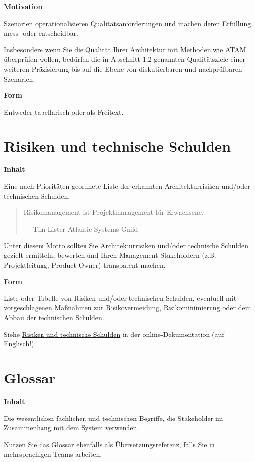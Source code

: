 \documentclass[
]{article}
\begin{document}
\textbf{Motivation}

Szenarien operationalisieren Qualitätsanforderungen und machen deren
Erfüllung mess- oder entscheidbar.

Insbesondere wenn Sie die Qualität Ihrer Architektur mit Methoden wie
ATAM überprüfen wollen, bedürfen die in Abschnitt 1.2 genannten
Qualitätsziele einer weiteren Präzisierung bis auf die Ebene von
diskutierbaren und nachprüfbaren Szenarien.

\textbf{Form}

Entweder tabellarisch oder als Freitext.

\hypertarget{section-technical-risks}{%
\section{Risiken und technische
Schulden}\label{section-technical-risks}}

\textbf{Inhalt}

Eine nach Prioritäten geordnete Liste der erkannten Architekturrisiken
und/oder technischen Schulden.

\begin{quote}
Risikomanagement ist Projektmanagement für Erwachsene.

---  Tim Lister Atlantic Systems Guild
\end{quote}

Unter diesem Motto sollten Sie Architekturrisiken und/oder technische
Schulden gezielt ermitteln, bewerten und Ihren Management-Stakeholdern
(z.B. Projektleitung, Product-Owner) transparent machen.

\textbf{Form}

Liste oder Tabelle von Risiken und/oder technischen Schulden, eventuell
mit vorgeschlagenen Maßnahmen zur Risikovermeidung, Risikominimierung
oder dem Abbau der technischen Schulden.

Siehe \href{https://docs.arc42.org/section-11/}{Risiken und technische
Schulden} in der online-Dokumentation (auf Englisch!).

\hypertarget{section-glossary}{%
\section{Glossar}\label{section-glossary}}

\textbf{Inhalt}

Die wesentlichen fachlichen und technischen Begriffe, die Stakeholder im
Zusammenhang mit dem System verwenden.

Nutzen Sie das Glossar ebenfalls als Übersetzungsreferenz, falls Sie in
mehrsprachigen Teams arbeiten.
\end{document}
